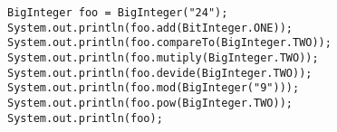 \documentclass[en, 11pt, xcolor=dvipsnames]{beamer}
\begin{document}
\begin{frame}[fragile]


	\begin{columns}[c]
		\begin{column}{0.9\textwidth}

			\begin{lstlisting}[style=Java]
BigInteger foo = BigInteger("24");
System.out.println(foo.add(BitInteger.ONE));
System.out.println(foo.compareTo(BigInteger.TWO));
System.out.println(foo.mutiply(BigInteger.TWO));
System.out.println(foo.devide(BigInteger.TWO));
System.out.println(foo.mod(BigInteger("9")));
System.out.println(foo.pow(BigInteger.TWO));
System.out.println(foo);\end{lstlisting}

		\end{column}
	\end{columns}

\end{frame}
\end{document}
